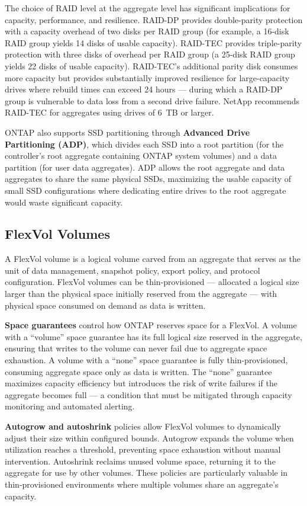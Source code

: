The choice of RAID level at the aggregate level has significant implications for capacity, performance, and resilience. RAID-DP provides double-parity protection with a capacity overhead of two disks per RAID group (for example, a 16-disk RAID group yields 14 disks of usable capacity). RAID-TEC provides triple-parity protection with three disks of overhead per RAID group (a 25-disk RAID group yields 22 disks of usable capacity). RAID-TEC's additional parity disk consumes more capacity but provides substantially improved resilience for large-capacity drives where rebuild times can exceed 24 hours --- during which a RAID-DP group is vulnerable to data loss from a second drive failure. NetApp recommends RAID-TEC for aggregates using drives of 6~TB or larger.

ONTAP also supports SSD partitioning through \textbf{Advanced Drive Partitioning (ADP)}, which divides each SSD into a root partition (for the controller's root aggregate containing ONTAP system volumes) and a data partition (for user data aggregates). ADP allows the root aggregate and data aggregates to share the same physical SSDs, maximizing the usable capacity of small SSD configurations where dedicating entire drives to the root aggregate would waste significant capacity.

\subsection{FlexVol Volumes}

A FlexVol volume is a logical volume carved from an aggregate that serves as the unit of data management, snapshot policy, export policy, and protocol configuration. FlexVol volumes can be thin-provisioned --- allocated a logical size larger than the physical space initially reserved from the aggregate --- with physical space consumed on demand as data is written.

\textbf{Space guarantees} control how ONTAP reserves space for a FlexVol. A volume with a ``volume'' space guarantee has its full logical size reserved in the aggregate, ensuring that writes to the volume can never fail due to aggregate space exhaustion. A volume with a ``none'' space guarantee is fully thin-provisioned, consuming aggregate space only as data is written. The ``none'' guarantee maximizes capacity efficiency but introduces the risk of write failures if the aggregate becomes full --- a condition that must be mitigated through capacity monitoring and automated alerting.

\textbf{Autogrow and autoshrink} policies allow FlexVol volumes to dynamically adjust their size within configured bounds. Autogrow expands the volume when utilization reaches a threshold, preventing space exhaustion without manual intervention. Autoshrink reclaims unused volume space, returning it to the aggregate for use by other volumes. These policies are particularly valuable in thin-provisioned environments where multiple volumes share an aggregate's capacity.

